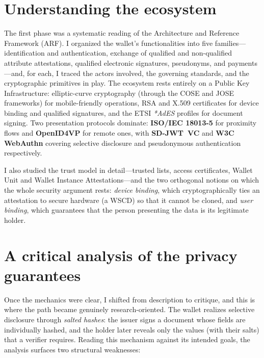 \documentclass[11pt]{article}
\begin{document}
\section{Understanding the ecosystem}
The first phase was a systematic reading of the Architecture and Reference Framework (ARF). I organized the wallet's functionalities into five families---identification and authentication, exchange of qualified and non-qualified attribute attestations, qualified electronic signatures, pseudonyms, and payments---and, for each, I traced the actors involved, the governing standards, and the cryptographic primitives in play. The ecosystem rests entirely on a Public Key Infrastructure: elliptic-curve cryptography (through the COSE and JOSE frameworks) for mobile-friendly operations, RSA and X.509 certificates for device binding and qualified signatures, and the ETSI \textit{*AdES} profiles for document signing. Two presentation protocols dominate: \textbf{ISO/IEC 18013-5} for proximity flows and \textbf{OpenID4VP} for remote ones, with \textbf{SD-JWT~VC} and \textbf{W3C WebAuthn} covering selective disclosure and pseudonymous authentication respectively.

I also studied the trust model in detail---trusted lists, access certificates, Wallet Unit and Wallet Instance Attestations---and the two orthogonal notions on which the whole security argument rests: \emph{device binding}, which cryptographically ties an attestation to secure hardware (a WSCD) so that it cannot be cloned, and \emph{user binding}, which guarantees that the person presenting the data is its legitimate holder.

\section{A critical analysis of the privacy guarantees}
Once the mechanics were clear, I shifted from description to critique, and this is where the path became genuinely research-oriented. The wallet realizes selective disclosure through \emph{salted hashes}: the issuer signs a document whose fields are individually hashed, and the holder later reveals only the values (with their salts) that a verifier requires. Reading this mechanism against its intended goals, the analysis surfaces two structural weaknesses:
\end{document}
